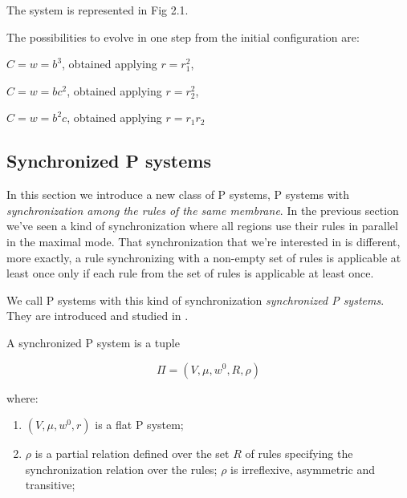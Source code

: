The system is represented in Fig 2.1.

\begin{figure}[h]
\centering


\caption{}
\label{}
\end{figure}

The possibilities to evolve in one step from the initial configuration are: 
\begin{description}
    \item $C=w=b^3$, obtained applying $r=r_1^2$,
    \item $C=w=bc^2$, obtained applying $r=r_2^2$,
    \item $C=w=b^2c$, obtained applying $r=r_1 r_2$
\end{description}

\subsection{Synchronized P systems}

In this section we introduce a new class of P systems, P systems with \textit{synchronization among the rules of the same membrane}.
In the previous section we've seen a kind of synchronization where all regions use their rules in parallel in the maximal mode.
That synchronization that we're interested in is different, more exactly, a rule synchronizing with a non-empty set of rules is applicable at least once only if each rule from the set of rules is applicable at least once.

We call P systems with this kind of synchronization \textit{synchronized P systems}.
They are introduced and studied in \cite{aman2019synchronization,aman2022power}.

\begin{definition}
A synchronized P system is a tuple

\[ \Pi = (V,\mu,w^0,R,\rho) \]

where:
\begin{enumerate}
    \item $(V,\mu,w^0,r)$ is a flat P system;    
    \item $\rho$ is a partial relation defined over the set $R$ of rules specifying
    the synchronization relation over the rules;
    $\rho$ is irreflexive, asymmetric and transitive;
\end{enumerate}
\end{definition}

